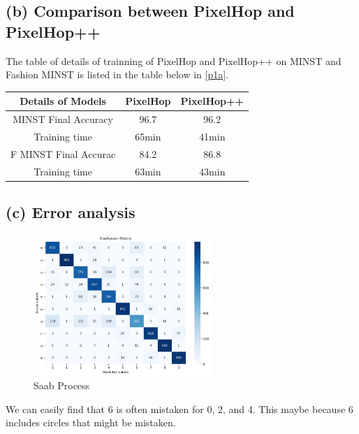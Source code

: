 \documentclass[12pt]{article}
\begin{document}
	 \subsection*{(b) Comparison between PixelHop and PixelHop++}
	 The table of details of trainning of PixelHop and PixelHop++ on MINST and Fashion MINST is listed in the table below in \ref{p1a}.
	 \begin{table}
	 	\centering
	 	\begin{tabular}{|c|c|c|}
	 		\hline  Details of Models&PixelHop&PixelHop++\\
	 		\hline MINST Final Accuracy&96.7&96.2\\
	 		\hline Training time&65min&41min\\
	 		\hline F MINST Final Accurac&84.2&86.8\\
	 		\hline Training time&63min&43min\\
	 		\hline
	 	\end{tabular}
	 \end{table}
	 \subsection*{(c) Error analysis}
	 	\begin{figure}[H]
	 	\centering
	 	\includegraphics[width=0.6\textwidth]{confusion.png}
	 	\caption{Saab Process}
	 	\label{confusion}
	 \end{figure}
 We can easily find that 6 is often mistaken for 0, 2, and 4. This maybe because 6 includes circles that might be mistaken. 
\end{document}
